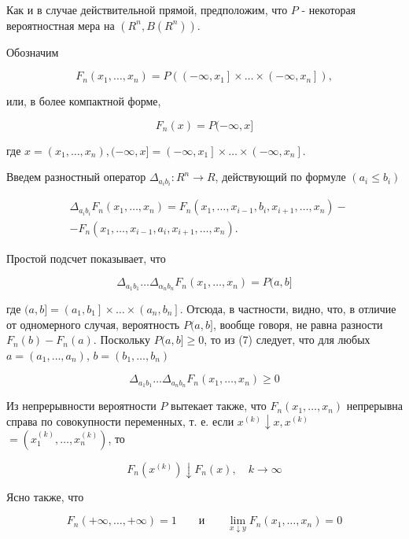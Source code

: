 Как и в случае действительной прямой, предположим, что ${P}$ - некоторая вероятностная мера на $\left(R^{n}, {B}\left(R^{n}\right)\right)$.

Обозначим

$$
F_{n}\left(x_{1}, \ldots, x_{n}\right)={P}\left(\left(-\infty, x_{1}\right] \times \ldots \times\left(-\infty, x_{n}\right]\right),
$$

или, в более компактной форме,

$$
F_{n}(x)={P}(-\infty, x]
$$

где $x=\left(x_{1}, \ldots, x_{n}\right),(-\infty, x]=\left(-\infty, x_{1}\right] \times \ldots \times\left(-\infty, x_{n}\right]$.

Введем разностный оператор $\Delta_{a_{i} b_{i}}: R^{n} \rightarrow R$, действующий по формуле $\left(a_{i} \leqslant b_{i}\right)$

$$
\begin{aligned}
& \Delta_{a_{i} b_{i}} F_{n}\left(x_{1}, \ldots, x_{n}\right)=F_{n}\left(x_{1}, \ldots, x_{i-1}, b_{i}, x_{i+1}, \ldots, x_{n}\right)- \\
& -F_{n}\left(x_{1}, \ldots, x_{i-1}, a_{i}, x_{i+1}, \ldots, x_{n}\right) \text {. }
\end{aligned}
$$

Простой подсчет показывает, что

$$
\Delta_{a_{1} b_{1}} \ldots \Delta_{\alpha_{n} b_{n}} F_{n}\left(x_{1}, \ldots, x_{n}\right)={P}(a, b]
$$

где $(a, b]=\left(a_{1}, b_{1}\right] \times \ldots \times\left(a_{n}, b_{n}\right]$. Отсюда, в частности, видно, что, в отличие от одномерного случая, вероятность ${P}(a, b]$, вообще говоря, не равна разности $F_{n}(b)-F_{n}(a)$. Поскольку ${P}(a, b] \geqslant 0$, то из (7) следует, что для любых $a=\left(a_{1}, \ldots, a_{n}\right)$, $b=\left(b_{1}, \ldots, b_{n}\right)$

$$
\Delta_{a_{1} b_{1}} \ldots \Delta_{a_{n} b_{n}} F_{n}\left(x_{1}, \ldots, x_{n}\right) \geqslant 0
$$

Из непрерывности вероятности ${P}$ вытекает также, что $F_{n}\left(x_{1}, \ldots, x_{n}\right)$ непрерывна справа по совокупности переменных, т. е. если $x^{(k)} \downarrow x, x^{(k)}$ $=\left(x_{1}^{(k)}, \ldots, x_{n}^{(k)}\right)$, то

$$
F_{n}\left(x^{(k)}\right) \downarrow F_{n}(x), \quad k \rightarrow \infty
$$

Ясно также, что

$$
F_{n}(+\infty, \ldots,+\infty)=1 \quad \quad \text{и} \quad \quad \lim _{x \downarrow y} F_{n}\left(x_{1}, \ldots, x_{n}\right)=0
$$

